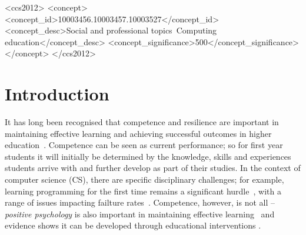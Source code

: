 \documentclass[sigconf]{acmart}
\begin{document}
\begin{CCSXML}
<ccs2012>
<concept>
<concept_id>10003456.10003457.10003527</concept_id>
<concept_desc>Social and professional topics~Computing education</concept_desc>
<concept_significance>500</concept_significance>
</concept>
</ccs2012>
\end{CCSXML}





\maketitle

\section{Introduction}
It has long been recognised that competence and resilience are important in maintaining effective learning and achieving successful outcomes in higher education~\cite{Marsten95,Walker2006,Holdsworth2018}. Competence can be seen as current performance; so for first year students it will initially be determined by the knowledge, skills and experiences students arrive with and further develop as part of their studies. In the context of computer science (CS), there are specific disciplinary challenges; for example, learning programming for the first time remains a significant hurdle~\cite{davenport-et-al:latice2016,murphy-et-al:programming2017,simon-et-al:sigcse2018}, with a range of issues impacting failture rates~\cite{Porter:2013:HFR:2445196.2445250,Watson:2014:FRI:2591708.2591749}. Competence, however, is not all -- \textit{positive psychology} is also important in maintaining effective learning~\cite{Seligman90} and evidence shows it can be developed through educational interventions \cite{Walker2006,Holdsworth2018}.
\end{document}
